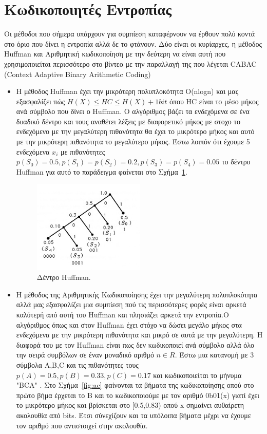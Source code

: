 \section{Κωδικοποιητές Εντροπίας}
\label{section:sect33}

\indent Οι μέθοδοι που σήμερα υπάρχουν για συμπίεση καταφέρνουν να έρθουν πολύ κοντά στο όριο που δίνει η εντροπία αλλά δε το φτάνουν. Δύο είναι οι κυρίαρχες, η μέθοδος Huffman και Αριθμητική κωδικοποίηση με την δεύτερη να είναι αυτή που χρησιμοποιείται περισσότερο στο βίντεο με την παραλλαγή της που λέγεται CABAC (Context Adaptive Binary Arithmetic Coding)
\begin{itemize}
  \item Η μέθοδος Huffman έχει την μικρότερη πολυπλοκότητα O(nlogn) και μας εξασφαλίζει πώς $ H(X) \leq HC \leq H(X)+1bit  $ όπου HC είναι το μέσο μήκος ανά σύμβολο που δίνει ο Huffman. Ο αλγόριθμος βάζει τα ενδεχόμενα σε ένα δυαδικό δέντρο και τους αναθέτει λέξεις με διαφορετικό μήκος με στοχο το ενδεχόμενο με την μεγαλύτερη πιθανότητα θα έχει το μικρότερο μήκος και αυτό με την μικρότερη πιθανότητα το μεγαλύτερο μήκος. Έστω λοιπόν ότι έχουμε 5 ενδεχόμενα $x_i$ με πιθανότητες $p(S_0) = 0.5, p(S_1)=p(S_2)=0.2, p(S_3)=p(S_4)=0.05$ το δέντρο Huffman για αυτό το παράδειγμα φαίνεται στο Σχήμα~\ref{fig:huffman}.
      \begin{figure}[h!]
          \centering
          \includegraphics[width=0.5\textwidth]{chapter3/huffman.jpg}
          \caption{Δέντρο Huffman.}
          \label{fig:huffman}
      \end{figure}

\newpage
  \item Η μέθοδος της Αριθμητικής Κωδικοποίησης έχει την μεγαλύτερη πολυπλοκότητα αλλά μας εξασφαλίζει μια συμπίεση πού τις περισσότερες φορές είναι αρκετά καλύτερή από αυτή του Huffman και πλησιάζει αρκετά την εντροπία.Ο αλγόριθμος όπως και στον Huffman έχει στόχο να δώσει μεγάλο μήκος στα ενδεχόμενα με την μικρότερη πιθανότητα και μικρό σε αυτά με την μεγαλύτερη. Η διαφορά του με τον Ηuffman είναι πως δεν κωδικοποιεί ανά σύμβολο αλλά όλο την σειρά συμβόλων σε έναν μοναδικό αριθμό $n \in R$. Έστω μια κατανομή με 3 σύμβολα A,B,C και τις πιθανότητες τους $ p(A) = 0.5, p(B) = 0.33, p(C) = 0.17 $ και κωδικοποιείται το μήνυμα "BCA" . Στο Σχήμα~\ref{fig:ac} φαίνονται τα βήματα της κωδικοποίησης οπού στο πρώτο βήμα έρχεται το B και το κωδικοποιούμε με τον αριθμό 0b01(x) γιατί έχει το μικρότερο μήκος και βρίσκεται στο [0.5,0.83) οπού x σημαίνει αυθαίρετη ακολουθία από bits. Έτσι σύνεχίζουν και τα υπόλοιπα βήματα μέχρι να έχουμε τον αριθμό που αντιστοιχεί στην ακολουθία.


\end{itemize}
